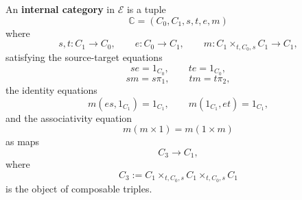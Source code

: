 \begin{definition}
\label{def:internal-category-as-endospan-monoid}
    An \textbf{internal category} in \(\mathcal E\) is a tuple
    \[
        \mathbb C=(C_0,C_1,s,t,e,m)
    \]
    where
    \[
        s,t:C_1\to C_0,
        \qquad
        e:C_0\to C_1,
        \qquad
        m:C_1\times_{t,C_0,s}C_1\to C_1,
    \]
    satisfying the source-target equations
    \[
        se=1_{C_0},
        \qquad
        te=1_{C_0},
    \]
    \[
        sm=s\pi_1,
        \qquad
        tm=t\pi_2,
    \]
    the identity equations
    \[
        m(e s,1_{C_1})=1_{C_1},
        \qquad
        m(1_{C_1},e t)=1_{C_1},
    \]
    and the associativity equation
    \[
        m(m\times 1)=m(1\times m)
    \]
    as maps
    \[
        C_3\to C_1,
    \]
    where
    \[
        C_3
        :=
        C_1\times_{t,C_0,s}C_1\times_{t,C_0,s}C_1
    \]
    is the object of composable triples.
\end{definition}

